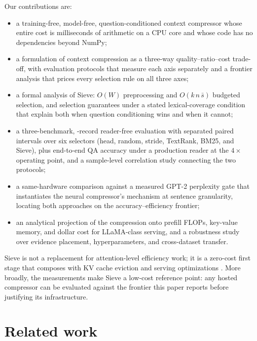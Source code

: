 \documentclass[review,12pt]{elsarticle}
\theoremstyle{remark}
\newcommand{\method}{Sieve}
\begin{document}
Our contributions are:
\begin{itemize}
\item a training-free, model-free, question-conditioned context
compressor whose entire cost is milliseconds of arithmetic on a CPU
core and whose code has no dependencies beyond NumPy;
\item a formulation of context compression as a three-way
quality--ratio--cost trade-off, with evaluation protocols that measure
each axis separately and a frontier analysis that prices every
selection rule on all three axes;
\item a formal analysis of \method{}: $O(W)$ preprocessing and
$O(k\,n\,\bar{s})$ budgeted selection, and selection guarantees under
a stated lexical-coverage condition that explain both when question
conditioning wins and when it cannot;
\item a three-benchmark, \TotalRecords{}-record reader-free evaluation
with separated paired intervals over six selectors (head, random,
stride, TextRank, BM25, and \method{}), plus end-to-end QA accuracy
under a production reader at the $4\times$ operating point, and a
sample-level correlation study connecting the two protocols;
\item a same-hardware comparison against a measured GPT-2 perplexity
gate that instantiates the neural compressor's mechanism at sentence
granularity, locating both approaches on the accuracy--efficiency
frontier;
\item an analytical projection of the compression onto prefill FLOPs,
key-value memory, and dollar cost for LLaMA-class serving, and a
robustness study over evidence placement, hyperparameters, and
cross-dataset transfer.
\end{itemize}

\method{} is not a replacement for attention-level efficiency work; it
is a zero-cost first stage that composes with KV cache eviction
\citep{zhang2023h2o,xiao2023streaming} and serving optimizations
\citep{dao2022flashattention,kwon2023vllm}. More broadly, the
measurements make \method{} a low-cost reference point: any hosted
compressor can be evaluated against the frontier this paper reports
before justifying its infrastructure.

\section{Related work}
\label{sec:related}
\end{document}
